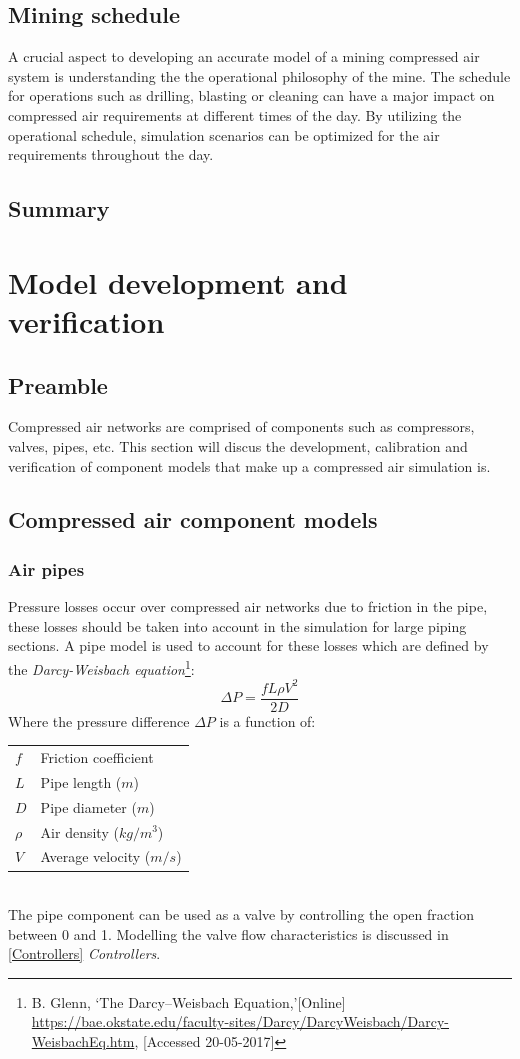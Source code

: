 	\subsection{Mining schedule}
		A crucial aspect to developing an accurate model of a mining compressed air system is understanding the the operational philosophy of the mine. The schedule for operations such as drilling,  blasting or cleaning can have a major impact on compressed air requirements at different times of the day. By utilizing the operational schedule, simulation scenarios can be optimized for the air requirements throughout the day.
	\subsection{Summary}
		
\section{Model development and verification}
	\subsection{Preamble}
	Compressed air networks are comprised of components such as compressors, valves, pipes, etc. This section will discus the development, calibration and verification of component models that make up a compressed air simulation is. 
	\subsection{Compressed air component models}
		\subsubsection{Air pipes}
		Pressure losses occur over compressed air networks due to friction in the pipe, these losses should be taken into account in the simulation for large piping sections. A pipe model is used to account for these losses which are defined by the \textit{Darcy-Weisbach equation}\footnote{ B. Glenn, \enquote*{The Darcy–Weisbach Equation,}[Online] \url{https://bae.okstate.edu/faculty-sites/Darcy/DarcyWeisbach/Darcy-WeisbachEq.htm}, [Accessed 20-05-2017]}:
		$$\Delta P = \frac{f  L \rho V^2}{2 D}$$
		Where the pressure difference $\Delta P $ is a function of:\\
		\begin{tabular}{p{1.3cm}p{13cm}}
		$f$ & Friction coefficient  \\
		$L$ & Pipe length ($m$) \\
		$D$ & Pipe diameter ($m$) \\
		$\rho$ & Air density ($kg/m^3$)\\	
		$V$ & Average velocity ($m/s$) \\
		\end{tabular} \\
		The pipe component can be used as a valve by controlling the open fraction between 0 and 1. Modelling the valve flow characteristics is discussed in \ref{Controllers} \textit{Controllers}.
